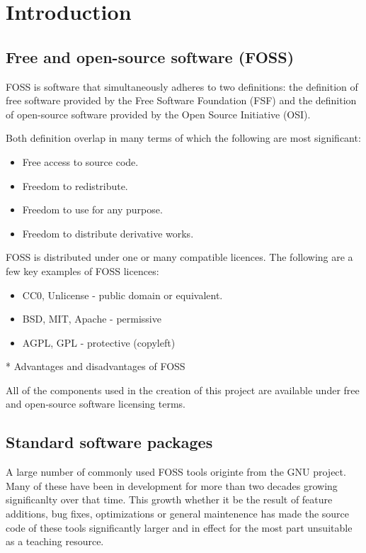 \section{Introduction}\label{Introduction}

\subsection{Free and open-source software (FOSS)}

FOSS is software that simultaneously adheres to two definitions: the definition of free software provided by the Free Software Foundation (FSF) and the definition of open-source software provided by the Open Source Initiative (OSI).

Both definition overlap in many terms of which the following are most significant:

\begin{itemize}
    \item Free access to source code.
    \item Freedom to redistribute.
    \item Freedom to use for any purpose.
    \item Freedom to distribute derivative works.
\end{itemize}

FOSS is distributed under one or many compatible licences. The following are a few key examples of FOSS licences:

\begin{itemize}
    \item CC0, Unlicense - public domain or equivalent.
    \item BSD, MIT, Apache - permissive
    \item AGPL, GPL - protective (copyleft)
\end{itemize}

* Advantages and disadvantages of FOSS

All of the components used in the creation of this project are available under free and open-source software licensing terms.

\subsection{Standard software packages}

A large number of commonly used FOSS tools originte from the GNU project. Many of these have been in development for more than two decades growing significanlty over that time. This growth whether it be the result of feature additions, bug fixes, optimizations or general maintenence has made the source code of these tools significantly larger and in effect for the most part unsuitable as a teaching resource.

